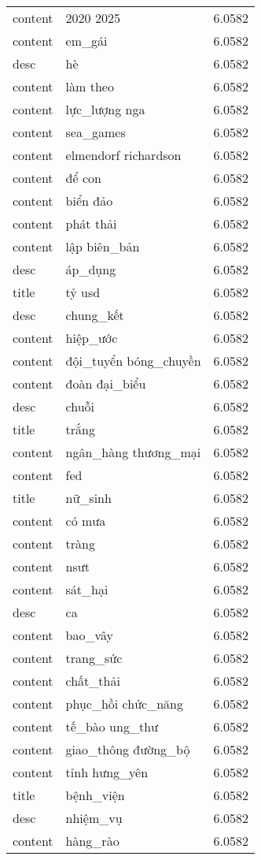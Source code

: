 \documentclass{article}
\begin{document}
\begin{tabular}{lll}
content & 2020 2025 & 6.0582\\
content & em\_gái & 6.0582\\
desc & hè & 6.0582\\
content & làm theo & 6.0582\\
content & lực\_lượng nga & 6.0582\\
content & sea\_games & 6.0582\\
content & elmendorf richardson & 6.0582\\
content & để con & 6.0582\\
content & biển đảo & 6.0582\\
content & phát thải & 6.0582\\
content & lập biên\_bản & 6.0582\\
desc & áp\_dụng & 6.0582\\
title & tỷ usd & 6.0582\\
desc & chung\_kết & 6.0582\\
content & hiệp\_ước & 6.0582\\
content & đội\_tuyển bóng\_chuyền & 6.0582\\
content & đoàn đại\_biểu & 6.0582\\
desc & chuỗi & 6.0582\\
title & trắng & 6.0582\\
content & ngân\_hàng thương\_mại & 6.0582\\
content & fed & 6.0582\\
title & nữ\_sinh & 6.0582\\
content & có mưa & 6.0582\\
content & tràng & 6.0582\\
content & nsưt & 6.0582\\
content & sát\_hại & 6.0582\\
desc & ca & 6.0582\\
content & bao\_vây & 6.0582\\
content & trang\_sức & 6.0582\\
content & chất\_thải & 6.0582\\
content & phục\_hồi chức\_năng & 6.0582\\
content & tế\_bào ung\_thư & 6.0582\\
content & giao\_thông đường\_bộ & 6.0582\\
content & tỉnh hưng\_yên & 6.0582\\
title & bệnh\_viện & 6.0582\\
desc & nhiệm\_vụ & 6.0582\\
content & hàng\_rào & 6.0582\\

\end{tabular}
\end{document}
